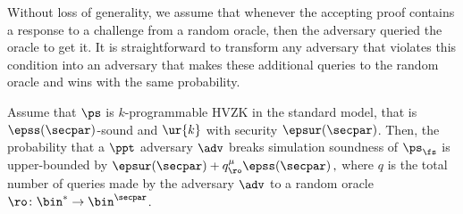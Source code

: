 Without loss of generality, we assume that whenever the accepting proof contains
a response to a challenge from a random oracle, then the adversary queried the
oracle to get it. It is straightforward to transform any adversary that violates
this condition into an adversary that makes these additional queries to the
random oracle and wins with the same probability.

\begin{theorem}
	\label{thm:simsnd}
	Assume that $\ps$ is $k$-programmable HVZK in the standard model, that is
	$\epss(\secpar)$-sound and $\ur{k}$ with security $\epsur(\secpar)$. Then, the
	probability that a $\ppt$ adversary $\adv$ breaks simulation soundness of
	$\ps_{\fs}$ is upper-bounded by
	\(
	\epsur(\secpar) + q_\ro^\mu  \epss(\secpar)\,,
	\)
	where $q$ is the total number of queries made by the adversary $\adv$ to a
	random oracle $\ro\colon \bin^{*} \to \bin^{\secpar}$.
\end{theorem}

